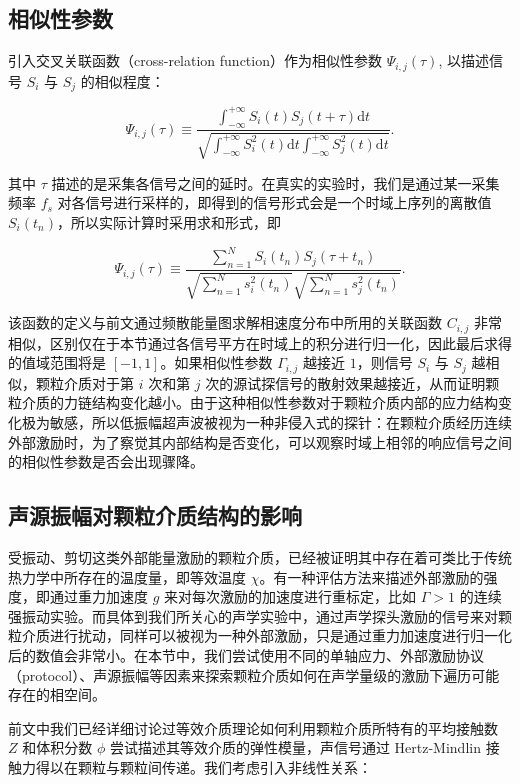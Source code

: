 \subsection{相似性参数}

引入交叉关联函数（cross-relation function）作为相似性参数 $\Psi_{i,j}(\tau)$, 以描述信号 $S_{i}$ 与 $S_{j}$ 的相似程度\cite{PhysRevLett.90.174302}：

\begin{equation}
  \Psi_{i,j}(\tau) \equiv \frac{\int_{-\infty}^{+\infty}S_{i}(t)S_{j}(t+\tau)\mathrm{d}t}{\sqrt{\int_{-\infty}^{+\infty}S_{i}^{2}(t)\mathrm{d}t\int_{-\infty}^{+\infty}S_{j}^{2}(t)\mathrm{d}t}}.
\end{equation}

其中 $\tau$ 描述的是采集各信号之间的延时。在真实的实验时，我们是通过某一采集频率 $f_{s}$ 对各信号进行采样的，即得到的信号形式会是一个时域上序列的离散值 $S_{i}(t_{n})$，所以实际计算时采用求和形式，即

\begin{equation}
  \Psi_{i,j}(\tau)\equiv \frac{\sum_{n=1}^{N}S_{i}(t_{n})S_{j}(\tau+t_{n})}{\sqrt{\sum_{n=1}^{N}s_{i}^{2}(t_{n})}\sqrt{\sum_{n=1}^{N}s_{j}^{2}(t_{n})}}.
\end{equation}

该函数的定义与前文通过频散能量图求解相速度分布中所用的关联函数 $C_{i,j}$ 非常相似，区别仅在于本节通过各信号平方在时域上的积分进行归一化，因此最后求得的值域范围将是 $[-1,1]$。如果相似性参数 $\Gamma_{i,j}$ 越接近 $1$，则信号 $S_{i}$ 与 $S_{j}$ 越相似，颗粒介质对于第 $i$ 次和第 $j$ 次的源试探信号的散射效果越接近，从而证明颗粒介质的力链结构变化越小。由于这种相似性参数对于颗粒介质内部的应力结构变化极为敏感，所以低振幅超声波被视为一种非侵入式的探针：在颗粒介质经历连续外部激励时，为了察觉其内部结构是否变化，可以观察时域上相邻的响应信号之间的相似性参数是否会出现骤降。

\subsection{声源振幅对颗粒介质结构的影响}

受振动、剪切这类外部能量激励的颗粒介质，已经被证明其中存在着可类比于传统热力学中所存在的温度量，即等效温度 $\chi$。有一种评估方法来描述外部激励的强度，即通过重力加速度 $g$ 来对每次激励的加速度进行重标定，比如 $\Gamma>1$ 的连续强振动实验。而具体到我们所关心的声学实验中，通过声学探头激励的信号来对颗粒介质进行扰动，同样可以被视为一种外部激励，只是通过重力加速度进行归一化后的数值会非常小。在本节中，我们尝试使用不同的单轴应力、外部激励协议（protocol）、声源振幅等因素来探索颗粒介质如何在声学量级的激励下遍历可能存在的相空间。

前文中我们已经详细讨论过等效介质理论如何利用颗粒介质所特有的平均接触数 $Z$ 和体积分数 $\phi$ 尝试描述其等效介质的弹性模量，声信号通过 Hertz-Mindlin 接触力得以在颗粒与颗粒间传递。我们考虑引入非线性关系：


